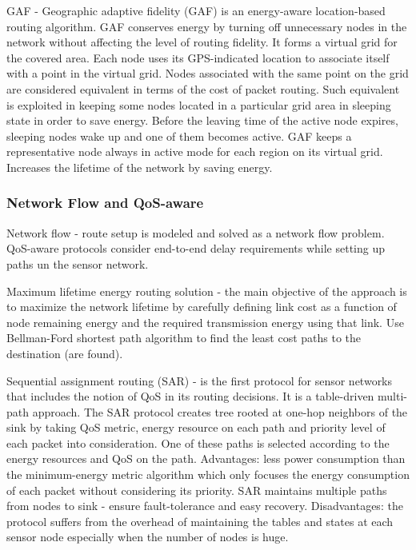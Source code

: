 GAF \cite{gaf} - Geographic adaptive fidelity (GAF) is an energy-aware location-based routing algorithm. GAF conserves energy by turning off unnecessary nodes in the network without affecting the level of routing fidelity. It forms a virtual grid for the covered area. Each node uses its GPS-indicated location to associate itself with a point in the virtual grid. Nodes associated with the same point on the grid are considered equivalent in terms of the cost of packet routing. Such equivalent is exploited in keeping some nodes located in a particular grid area in sleeping state in order to save energy. Before the leaving time of the active node expires, sleeping nodes wake up and one of them becomes active. GAF keeps a representative node always in active mode for each region on its virtual grid. Increases the lifetime of the network by saving energy.

\subsubsection{Network Flow and QoS-aware}
Network flow - route setup is modeled and solved as a network flow problem. QoS-aware protocols consider end-to-end delay requirements while setting up paths un the sensor network. 

\cite{maxlifetimechang} Maximum lifetime energy routing solution - the main objective of the approach is to maximize the network lifetime by carefully defining link cost as a function of node remaining energy and the required transmission energy using that link. Use Bellman-Ford shortest path algorithm to find the least cost paths to the destination (are found).

Sequential assignment routing (SAR) \cite{sar} - is the first protocol for sensor networks that includes the notion of QoS in its routing decisions. It is a table-driven multi-path approach. The SAR protocol creates tree rooted at one-hop neighbors of the sink by taking QoS metric, energy resource on each path and priority level of each packet into consideration. One of these paths is selected according to the energy resources and QoS on the path. 
Advantages: less power consumption than the minimum-energy metric algorithm which only focuses the energy consumption of each packet without considering its priority. SAR maintains multiple paths from nodes to sink - ensure fault-tolerance and easy recovery.
Disadvantages: the protocol suffers from the overhead of maintaining the tables and states at each sensor node especially when the number of nodes is huge.

